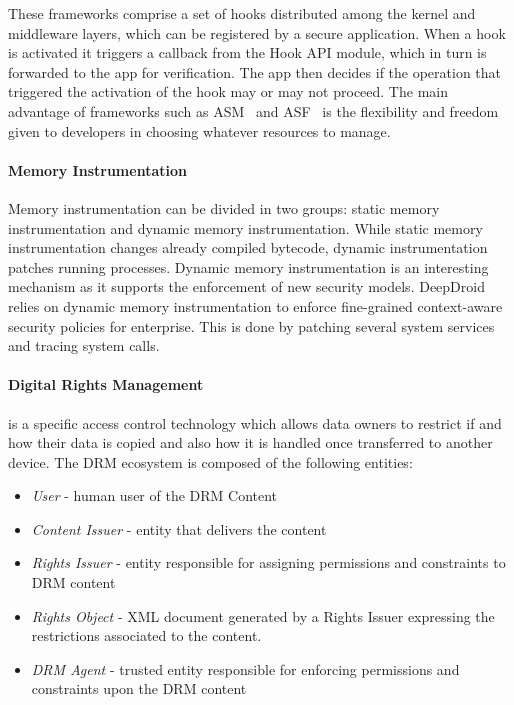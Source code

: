 These frameworks comprise a set of hooks distributed among the kernel and middleware layers, which can be registered by a secure application. When a hook is activated it triggers a callback from the Hook API module, which in turn is forwarded to the app for verification. The app then decides if the operation that triggered the activation of the hook may or may not proceed. The main advantage of frameworks such as \ac{ASM}~\cite{heuser2014asm} and \ac{ASF}~\cite{backes2014android} is the flexibility and freedom given to developers in choosing whatever resources to manage.

\paragraph{\textbf{Memory Instrumentation}}
Memory instrumentation can be divided in two groups: static memory instrumentation and dynamic memory instrumentation. While static memory instrumentation changes already compiled bytecode, dynamic instrumentation patches running processes. Dynamic memory instrumentation is an interesting mechanism as it supports the enforcement of new security models. DeepDroid~\cite{wang2015deepdroid} relies on dynamic memory instrumentation to enforce fine-grained context-aware security policies for enterprise. This is done by patching several system services and tracing system calls.

\paragraph{\textbf{Digital Rights Management}} is a specific access control technology which allows data owners to restrict if and how their data is copied and also how it is handled once transferred to another device. The \ac{DRM} ecosystem is composed of the following entities:

\begin{itemize}
	\item \emph{User} - human user of the DRM Content
	\item \emph{Content Issuer} - entity that delivers the content
	\item \emph{Rights Issuer} - entity responsible for assigning permissions and constraints to \ac{DRM} content
	\item \emph{Rights Object} - XML document generated by a Rights Issuer expressing the restrictions associated to the content.
	\item \emph{\ac{DRM} Agent} - trusted entity responsible for enforcing permissions and constraints upon the \ac{DRM} content
\end{itemize}

